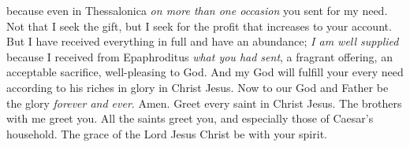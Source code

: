 \begin{biblechapter}
\verse because even in Thessalonica \textit{on more than one occasion} you sent for my need.
\verse Not that I seek the gift, but I seek for the profit that increases to your account.
\verse But I have received everything in full and have an abundance; \textit{I am well supplied} because I received from Epaphroditus \textit{what you had sent}, a fragrant offering, an acceptable sacrifice, well-pleasing to God.
\verse And my God will fulfill your every need according to his riches in glory in Christ Jesus.
\verse Now to our God and Father be the glory \textit{forever and ever}. Amen.
 Greet every saint in Christ Jesus. The brothers with me greet you.
\verse All the saints greet you, and especially those of Caesar’s household.
\verse The grace of the Lord Jesus Christ be with your spirit.
\end{biblechapter}


